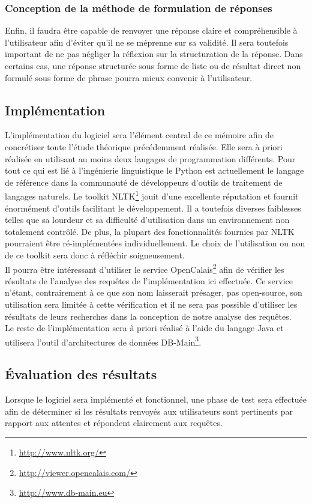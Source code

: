 \documentclass[a4paper,12pt]{article}
\begin{document}
\subsubsection{Conception de la méthode de formulation de réponses}
Enfin, il faudra être capable de renvoyer une réponse claire et compréhensible à l'utilisateur afin d'éviter qu'il ne se méprenne sur sa validité.
Il sera toutefois important de ne pas négliger la réflexion sur la structuration de la réponse.
Dans certains cas, une réponse structurée sous forme de liste ou de résultat direct non formulé sous forme de phrase pourra mieux convenir à l'utilisateur.
\subsection{Implémentation}
L'implémentation du logiciel sera l'élément central de ce mémoire afin de concrétiser toute l'étude théorique précédemment réalisée.
Elle sera à priori réalisée en utilisant au moins deux langages de programmation différents.
Pour tout ce qui est lié à l'ingénierie linguistique le Python est actuellement le langage de référence dans la communauté de développeurs d'outils de traitement de langages naturels.
Le toolkit NLTK\footnote{\url{http://www.nltk.org/}} jouit d'une excellente réputation et fournit énormément d'outils facilitant le développement.
Il a toutefois diverses faiblesses telles que sa lourdeur et sa difficulté d'utilisation dans un environnement non totalement contrôlé.
De plus, la plupart des fonctionnalités fournies par NLTK pourraient être ré-implémentées individuellement.
Le choix de l'utilisation ou non de ce toolkit sera donc à réfléchir soigneusement. \\

Il pourra être intéressant d'utiliser le service OpenCalais\footnote{\url{http://viewer.opencalais.com/}} afin de vérifier les résultats de l'analyse des requêtes de l'implémentation ici effectuée.
Ce service n'étant, contrairement à ce que son nom laisserait présager, pas open-source, son utilisation sera limitée à cette vérification et il ne sera pas possible d'utiliser les résultats de leurs recherches dans la conception de notre analyse des requêtes. \\

Le reste de l'implémentation sera à priori réalisé à l'aide du langage Java et utilisera l'outil d'architectures de données DB-Main\footnote{\url{http://www.db-main.eu}}.
\subsection{Évaluation des résultats}
Lorsque le logiciel sera implémenté et fonctionnel, une phase de test sera effectuée afin de déterminer si les résultats renvoyés aux utilisateurs sont pertinents par rapport aux attentes et répondent clairement aux requêtes.
\end{document}
